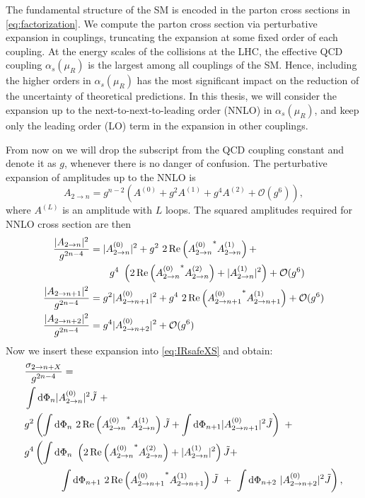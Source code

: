 The fundamental structure of the SM is encoded in the parton cross sections  in \cref{eq:factorization}.
We compute the parton cross section via perturbative expansion in couplings, truncating
the expansion at some fixed order of each coupling.
At the energy scales of the collisions at the LHC, the effective QCD coupling $\alpha_s(\mu_R)$ is the largest among
all couplings of the SM.
Hence, including the higher orders in  $\alpha_s(\mu_R)$ has the most significant impact on the reduction
of the uncertainty of theoretical predictions.
In this thesis, we will consider the expansion up to the next-to-next-to-leading order (NNLO) in $\alpha_s(\mu_R)$,
and keep only the leading order (LO) term in the expansion in other couplings.

From now on we will drop the subscript from the QCD coupling constant and denote it as $g$, whenever there is no danger of confusion.
The perturbative expansion of amplitudes up to the NNLO is
\begin{equation}
  \label{eq:amplitudes_expansion}
  A_{2\to n} = g^{n-2} \left( A^{(0)} + g^2 A^{(1)} + g^4 A^{(2)} + \mathcal{O}(g^{6}) \right),
\end{equation}
where $A^{(L)}$ is an amplitude with $L$ loops.
The squared amplitudes required for NNLO cross section are then
\begin{subequations}
  \begin{align}
    \frac{\vert A_{2\to n} \vert^2}{g^{2n-4}}  &= \vert A^{(0)}_{2\to n} \vert^2 + g^2~2\Re\left({A^{(0)}_{2\to n}}^{*} A^{(1)}_{2\to n}\right) + \\ & \qquad g^4~\left(2\Re\left({A^{(0)}_{2\to n}}^{*} A^{(2)}_{2\to n}\right) + \vert A^{(1)}_{2\to n} \vert^2 \right)+ \mathcal{O}(g^{6})  \\
    \frac{\vert A_{2\to n+1} \vert^2}{g^{2n-4}} &= g^2 \vert A^{(0)}_{2\to n+1} \vert^2 + g^4~2\Re\left({A^{(0)}_{2\to n+1}}^{*} A^{(1)}_{2\to n+1}\right) + \mathcal{O}(g^{6}) \\
    \frac{\vert A_{2\to n+2} \vert^2}{g^{2n-4}} &= g^4 \vert A^{(0)}_{2\to n+2} \vert^2 + \mathcal{O}(g^{6})
  \end{align}
\end{subequations}
Now we insert these expansion into \eqref{eq:IRsafeXS} and obtain:
\begin{subequations}
  \label{eq:NNLO_xs}
  \begin{align}
    \nonumber
    & \frac{\sigma_{2\rightarrow n + X}}{g^{2n-4}} = \\
    & \int \dd\Phi_n \vert A^{(0)}_{2\to n} \vert^2 \tilde{J}  ~+ \\
    & g^{2} \left( \int \dd\Phi_n~2\Re\left({A^{(0)}_{2\to n}}^{*} A^{(1)}_{2\to n}\right) \tilde{J}  + \int \dd\Phi_{n+1} \vert A^{(0)}_{2\to n+1} \vert^2 \tilde{J} \right) ~+ \\
    & g^{4} \left( \int \dd\Phi_n~ \left( 2\Re\left({A^{(0)}_{2\to n}}^{*} A^{(2)}_{2\to n}\right) + \vert A^{(1)}_{2\to n} \vert^2 \right) \tilde{J}   + \right. \\ 
    \label{eq:RR}
    & \hspace{8ex} \left. \int \dd\Phi_{n+1}~ 2\Re\left({A^{(0)}_{2\to n+1}}^{*} A^{(1)}_{2\to n+1}\right) \tilde{J} ~+~ \int \dd\Phi_{n+2}~ \vert A^{(0)}_{2\to n+2} \vert^2 \tilde{J} \right),
  \end{align}
\end{subequations}
